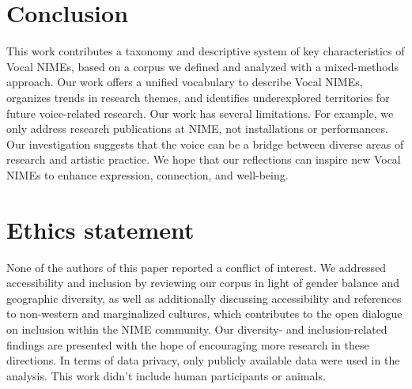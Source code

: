 \documentclass[sigconf]{nimeart}
\begin{document}
\section{Conclusion}\label{conclusion}

This work contributes a taxonomy and descriptive system of key characteristics of Vocal NIMEs, based on a corpus we defined and analyzed with a mixed-methods approach. Our work offers a unified vocabulary to describe Vocal NIMEs, organizes trends in research themes, and identifies underexplored territories for future voice-related research. Our work has several limitations. For example, we only address research publications at NIME, not installations or performances. Our investigation suggests that the voice can be a bridge between diverse areas of research and artistic practice. We hope that our reflections can inspire new Vocal NIMEs to enhance expression, connection, and well-being.\\

\section{Ethics statement}\label{ethics-statement}

None of the authors of this paper reported a conflict of interest. We addressed accessibility and inclusion by reviewing our corpus in light of gender balance and geographic diversity, as well as additionally discussing accessibility and references to non-western and marginalized cultures, which contributes to the open dialogue on inclusion within the NIME community. Our diversity- and inclusion-related findings are presented with the hope of encouraging more research in these directions. In terms of data privacy, only publicly available data were used in the analysis. This work didn't include human participants or animals.~

\section{}\label{section}



\end{document}
